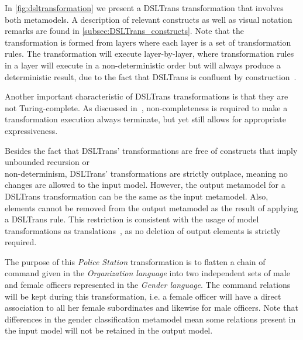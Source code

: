 In \cref{fig:dsltransformation} we present a DSLTrans transformation that involves both metamodels.  A description of relevant constructs as well as visual notation remarks are found in \cref{subsec:DSLTrans_constructs}. Note
that the transformation is formed
from layers where each layer is a set of transformation rules. The
transformation will execute layer-by-layer, where transformation rules in a layer will execute in a
non-deterministic order but will always produce a deterministic result, due to the fact that DSLTrans is confluent by construction~\cite{DBLP:conf/sle/BarrocaLAFS10}.

Another important characteristic of DSLTrans transformations is that they are not Turing-complete. As discussed in~\cite{DBLP:conf/sle/BarrocaLAFS10}, non-completeness is required to make a transformation execution always terminate, but yet still allows for appropriate expressiveness.

Besides the fact that DSLTrans' transformations are free of constructs that
imply unbounded recursion or \\non-determinism, DSLTrans' transformations are strictly outplace, meaning no changes are allowed to the input model. However, the output metamodel for a DSLTrans transformation can
be the same as the input metamodel. Also, elements cannot be removed
from the output metamodel as the result of applying a DSLTrans rule.
This restriction is consistent with the usage of model transformations as
translations~\cite{AMT2012}, as no deletion of output elements is strictly required.

The purpose of this \emph{Police Station} transformation is to flatten a chain of command given
in the \emph{Organization language} into two independent sets of male
and female officers represented in the \emph{Gender language}. The command
relations will be kept during this transformation, i.e. a female officer will
have a direct association to all her female subordinates and likewise for male
officers. Note that differences in the gender classification metamodel mean
some relations present in the input model will not be retained in the output
model.

